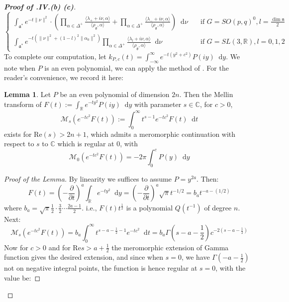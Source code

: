 \documentclass[11pt]{report}
\theoremstyle{definition}
\newtheorem{Lemma}[Def]{Lemma}
\theoremstyle{plain}
\newcommand{\real}{\mathbb{R}}
\newcommand{\complex}{\mathbb{C}}
\newcommand{\brac}[1]{\langle #1 \rangle}
\newcommand{\diff}[2]{\frac{\partial #1}{\partial #2}}
\newcommand{\norm}[1]{\lVert #1 \rVert}
\newcommand{\mass}[1]{\mathop{}\mathrm{d}{#1}}
\newcommand{\Lie}[1]{\mathfrak{#1}}
\renewcommand{\Re}{\mathrm{Re}}
\begin{document}
\begin{proof}[\textbf{Proof of .IV.(b) (c)}]
\begin{equation}
\begin{cases}
\int_{\Lie{a}^*}e^{-t\norm{\nu}^2}\cdot(\prod_{\alpha\in\Delta^+}\frac{\brac{\lambda_{+}+i\nu, \alpha}}{\brac{\rho_{\Lie{g}},\alpha}}+\prod_{\alpha\in\Delta^+}\frac{\brac{\lambda_{-}+i\nu, \alpha}}{\brac{\rho_{\Lie{g}},\alpha}})\mass{\nu}\quad &\text{if $G=SO(p,q)^0, l=\frac{\dim\Lie{n}}{2}$}\\
\int_{\Lie{a}^*}e^{-t(\norm{\nu}^2+(1-l)^2\norm{\alpha_0}^2)}\prod_{\alpha\in\Delta^+}\frac{\brac{\lambda_{l}+i\nu, \alpha}}{\brac{\rho_{\Lie{g}},\alpha}}\mass{\nu}\quad &\text{if $G=SL(3,\real), l=0,1,2$}
\end{cases}
\end{equation} 
To complete our computation, let $k_{P,c}(t)=\int_{-\infty}^{\infty}e^{-t(y^2+c^2)}P(iy)\mass{y}$. We note when $P$ is an even polynomial, we can apply the method of \cite[Lemma~2,3]{fried1986}. For the reader's convenience, we record it here:
\begin{Lemma}\label{fried3}
	Let $P$ be an even polynomial of dimension $2n$. Then the Mellin transform of $F(t):=\int_{\real}^{}e^{-ty^2}P(iy)\mass{y}$ with parameter $s\in \complex$, for $c>0$,
	\begin{equation}
	\mathcal{M}_s(e^{-tc^2}F(t)):=\int_{0}^{\infty}t^{s-1}e^{-tc^2}F(t)\mass{t}
	\end{equation}
	exists for $\Re(s)>2n+1$, which admits a meromorphic continuation with respect to $s$ to $\complex$ which is regular at $0$, with 
	\begin{equation}
	\mathcal{M}_0(e^{-tc^2}F(t))=-2\pi\int_0^cP(y)\mass{y}
	\end{equation}
\end{Lemma}
\begin{proof}[Proof of the Lemma]
By linearity we suffices to assume $P=y^{2a}$. Then:
\begin{equation*}
F(t)=(-\diff{}{t})^a\int_{\real}^{}e^{-ty^2}\mass{y}=(-\diff{}{t})^a\sqrt{\pi}t^{-1/2}=b_at^{-a-(1/2)}
\end{equation*}
where $b_a=\sqrt{\pi}\frac{1}{2}\cdot\frac{3}{2}\cdots \frac{2a-1}{2}$. i.e., $F(t)t^{\frac{1}{2}}$ is a polynomial $Q(t^{-1})$ of degree $n$. Next:
\begin{equation}
\mathcal{M}_s(e^{-tc^2}F(t))=b_a\int_{0}^{\infty}t^{s-a-\frac{1}{2}-1}e^{-tc^2}\mass{t}=b_a\Gamma(s-a-\frac{1}{2})c^{-2(s-a-\frac{1}{2})}
\end{equation}
Now for $c>0$ and for $\Re s>{a+\frac{1}{2}}$ the meromorphic extension of Gamma function gives the desired extension, and since when $s=0$, we have $\Gamma(-a-\frac{1}{2})$ not on negative integral points, the function is hence regular at $s=0$, with the value be:

\end{proof}
\end{proof}
\end{document}
